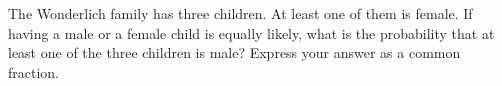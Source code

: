 The Wonderlich family has three children. At least one of them is female. If having a male or a female child is equally likely, what is the probability that at least one of the three children is male? Express your answer as a common fraction.
